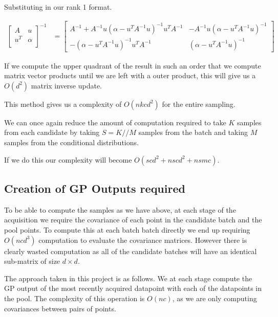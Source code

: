 \documentclass[12pt, a4paper]{report}
\theoremstyle{definition}
\theoremstyle{definition}
\theoremstyle{definition}
\begin{document}
Substituting in our rank 1 format.

\begin{align*}
    \begin{bmatrix}
        A & u \\
        u^T & \alpha \\
    \end{bmatrix}^{-1} &= \begin{bmatrix}
        A^{-1} + A^{-1} u \left(\alpha - u^T A^{-1} u \right)^{-1} u^T  A^{-1} & -A^{-1} u \left( \alpha - u^T A^{-1}u\right)^{-1} \\
        - \left(\alpha - u^T A^{-1}u \right)^{-1} u^T A^{-1} & \left(\alpha - u^T A^{-1} u\right)^{-1}
    \end{bmatrix}
\end{align*}

If we compute the upper quadrant of the result in such an order that we compute matrix vector products until we are left with a outer product, this will give us a $O(d^2)$ matrix inverse update.


This method gives us a complexity of  $O\left(nkcd^2 \right)$ for the entire sampling.


We can once again reduce the amount of computation required to take $K$ samples from each candidate by taking $S = K // M$ samples from the batch and taking $M$ samples from the conditional distributions.


If we do this our complexity will become $O\left(scd^2 + nscd^2 + nsmc\right)$.

\subsection{Creation of GP Outputs required}

To be able to compute the samples as we have above, at each stage of the acquisition we require the covariance of each point in the candidate batch and the pool points. To compute this at each batch batch directly we end up requiring $O(ncd^3)$ computation to evaluate the covariance matrices. However there is clearly wasted computation as all of the candidate batches will have an identical sub-matrix of size $d \times d$.

The approach taken in this project is as follows. We at each stage compute the GP output of the most recently acquired datapoint with each of the datapoints in the pool. The complexity of this operation is $O(nc)$, as we are only computing covariances between pairs of points.
\end{document}
